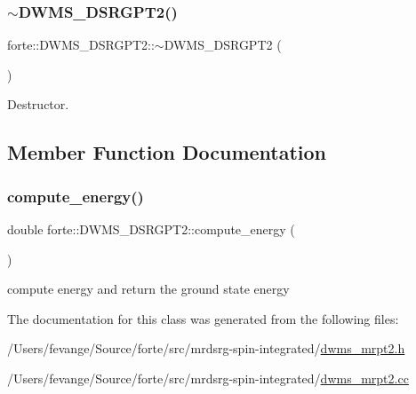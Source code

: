 \subsubsection{\texorpdfstring{$\sim$\+D\+W\+M\+S\+\_\+\+D\+S\+R\+G\+P\+T2()}{~DWMS\_DSRGPT2()}}
{\footnotesize\ttfamily forte\+::\+D\+W\+M\+S\+\_\+\+D\+S\+R\+G\+P\+T2\+::$\sim$\+D\+W\+M\+S\+\_\+\+D\+S\+R\+G\+P\+T2 (\begin{DoxyParamCaption}{ }\end{DoxyParamCaption})}



Destructor. 



\subsection{Member Function Documentation}
\mbox{\label{classforte_1_1_d_w_m_s___d_s_r_g_p_t2_a61564604a8e13f4ef0ea6cd9de6430c0}} 
\subsubsection{\texorpdfstring{compute\+\_\+energy()}{compute\_energy()}}
{\footnotesize\ttfamily double forte\+::\+D\+W\+M\+S\+\_\+\+D\+S\+R\+G\+P\+T2\+::compute\+\_\+energy (\begin{DoxyParamCaption}{ }\end{DoxyParamCaption})}



compute energy and return the ground state energy 



The documentation for this class was generated from the following files\+:\begin{DoxyCompactItemize}
\item 
/\+Users/fevange/\+Source/forte/src/mrdsrg-\/spin-\/integrated/\mbox{\hyperlink{dwms__mrpt2_8h}{dwms\+\_\+mrpt2.\+h}}\item 
/\+Users/fevange/\+Source/forte/src/mrdsrg-\/spin-\/integrated/\mbox{\hyperlink{dwms__mrpt2_8cc}{dwms\+\_\+mrpt2.\+cc}}\end{DoxyCompactItemize}
